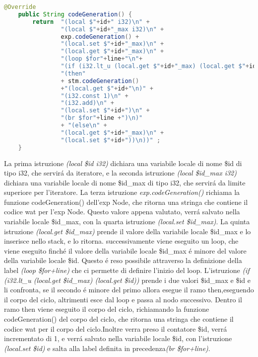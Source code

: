 \documentclass[../../main.tex]{subfiles}
\begin{document}
\begin{lstlisting}[language=Java, caption={codeGeneration() per il for Node}, label={lst:codeGenerationFor}]
    @Override
    public String codeGeneration() {
        return  "(local $"+id+" i32)\n" +
                "(local $"+id+"_max i32)\n" +
                exp.codeGeneration() +  
                "(local.set $"+id+"_max)\n" +      
                "(local.get $"+id+"_max)\n" +      
                "(loop $for"+line+"\n"+
                "(if (i32.lt_u (local.get $"+id+"_max) (local.get $"+id+"))\n"+ 
                "(then"
                + stm.codeGeneration()  
                +"(local.get $"+id+"\n)" +      
                "(i32.const 1)\n" +       
                "(i32.add)\n" +           
                "(local.set $"+id+")\n" +      
                "(br $for"+line +")\n)"            
                + "(else\n" +               
                "(local.get $"+id+"_max)\n" +   
                "(local.set $"+id+"))\n))" ;       
    }
\end{lstlisting}

La prima istruzione \textit{(local \$id i32)} dichiara una variabile locale di nome \$id di tipo i32, che servirá da iteratore, e la seconda istruzione \textit{(local \$id\_max i32)} dichiara una variabile locale di nome \$id\_max di tipo i32, che servirá da limite superiore per l'iteratore.
La terza istruzione \textit{exp.codeGeneration()} richiama la funzione codeGeneration() dell'exp Node, che ritorna una stringa che contiene il codice wat per l'exp Node.
Questo valore appena valutato, verrá salvato nella variabile locale \$id\_max, con la quarta istruzione \textit{(local.set \$id\_max)}.
La quinta istruzione \textit{(local.get \$id\_max)} prende il valore della variabile locale \$id\_max e lo inserisce nello stack, e lo ritorna.
successivamente viene eseguito un loop, che viene eseguito finché il valore della variabile locale \$id\_max é minore del valore della variabile locale \$id.
Questo é reso possibile attraverso la definizione della label \textit{(loop \$for+line)} che ci permette di definire l'inizio del loop.
L'istruzione \textit{(if (i32.lt\_u (local.get \$id\_max) (local.get \$id))} prende i due valori \$id\_max e \$id e li confronta, se il secondo é minore del primo allora esegue il ramo then,eseguendo il corpo del ciclo, altrimenti esce dal loop e passa al nodo successivo.
Dentro il ramo then viene eseguito il corpo del ciclo, richiamando la funzione codeGeneration() del corpo del ciclo, che ritorna una stringa che contiene il codice wat per il corpo del ciclo.Inoltre verra preso il contatore \$id, verrá incrementato di 1, e verrá salvato nella variabile locale \$id, con l'istruzione \textit{(local.set \$id)} e salta alla label definita in precedenza\textit{(br \$for+line)}.
\end{document}
